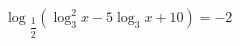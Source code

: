 \begin{ex}[type=equation]
	\begin{condition}
		$\log$\tiny$_{\dfrac{1}{2}}$\normalsize$ (\log_3^2 x - 5\log_3 x + 10) = -2$
	\end{condition}
\end{ex}